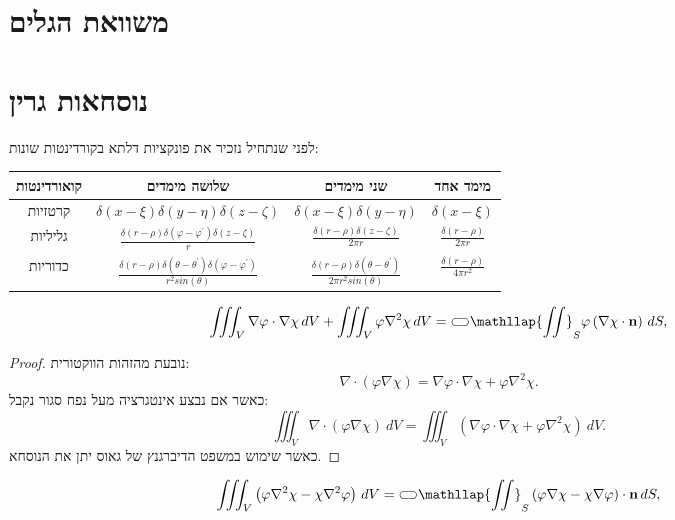 \documentclass{tstextbook}
\begin{document}
\section{משוואת הגלים}

\section{נוסחאות גרין}

לפני שנתחיל נזכיר את פונקציות דלתא בקורדינטות שונות:

\begin{table}[htbp]
  \centering
  \begin{tabular}{|cccc|}
    \hline
    קואורדינטות & שלושה מימדים & שני מימדים & מימד אחד \\ \hline
    קרטזיות & \(\delta(x-\xi)\delta(y-\eta)\delta(z-\zeta)\) & \(\delta(x-\xi)\delta(y-\eta)\) & \(\delta(x-\xi)\) \\ \hline
    גליליות & \(\frac{\delta(r-\rho)\delta(\varphi-\varphi^{\prime})\delta(z-\zeta)}{r}\) & \(\frac{\delta(r-\rho)\delta(z-\zeta)}{2\pi r}\) & \(\frac{\delta(r-\rho)}{2\pi r}\) \\ \hline
    כדוריות & \(\frac{\delta(r-\rho)\delta(\theta-\theta^{\prime})\delta(\varphi-\varphi^{\prime})}{r^{2}sin(\theta)}\) & \(\frac{\delta(r-\rho)\delta(\theta-\theta^{\prime})}{2\pi r^{2}sin(\theta)}\) & \(\frac{\delta(r-\rho)}{4\pi r^{2}}\) \\ \hline
  \end{tabular}
\end{table}
\begin{proposition}
$$\iiint_{V}\nabla\varphi\cdot\nabla\chi\,d V+\iiint_{V}\varphi\nabla^{2}\chi\,d V={\subset\!\supset} \mathllap{\iint}_{S}\varphi\left( \nabla\chi\cdot\mathbf{n} \right)\,d S,$$

\end{proposition}
\begin{proof}
נובעת מהזהות הווקטורית:
$$\nabla\cdot(\varphi\nabla\chi)=\nabla\varphi\cdot\nabla\chi+\varphi\nabla^{2}\chi.$$
כאשר אם נבצע אינטגרציה מעל נפח סגור נקבל:
$$\iiint_{V}\nabla\cdot(\varphi\nabla\chi)\ d V=\iiint_{V}\left(\nabla\varphi\cdot\nabla\chi+\varphi\nabla^{2}\chi\right)\ d V.$$
כאשר שימוש במשפט הדיברגנץ של גאוס יתן את הנוסחא.

\end{proof}
\begin{proposition}
$$\iiint_{V}\left(\varphi\nabla^{2}\chi-\chi\nabla^{2}\varphi\right)\,d V={\subset\!\supset} \mathllap{\iint}_{S}\left(\varphi\nabla\chi-\chi\nabla\varphi\right)\cdot\mathbf{n}\,d S,
$$

\end{proposition}
\end{document}
